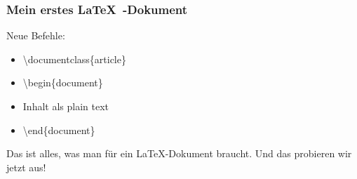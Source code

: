 \begin{frame}
\frametitle{Mein erstes \LaTeX~-Dokument}
\begin{block}{Neue Befehle:}
\begin{itemize}
\item \begin{ttfamily}\color{nounibaredII}\textbackslash documentclass\color{nounibagreenI}\color{black}\{article\}\end{ttfamily}
\item \begin{ttfamily}\color{unibablueI}\textbackslash begin\color{black}\{document\}\end{ttfamily}
\item \begin{ttfamily} Inhalt als plain text \end{ttfamily}
\item \begin{ttfamily}\color{unibablueI}\textbackslash end\color{black}\{document\}\end{ttfamily}
\end{itemize}
\end{block}
Das ist alles, was man für ein \LaTeX -Dokument braucht. Und das probieren wir jetzt aus!

\end{frame}
